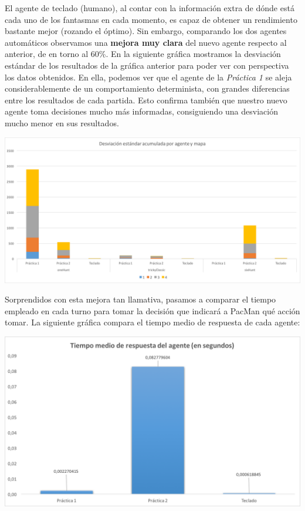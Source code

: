 \documentclass[12pt]{article}
\begin{document}
El agente de teclado (humano), al contar con la información extra de dónde está cada uno de los fantasmas en cada momento, es capaz de obtener un rendimiento bastante mejor (rozando el óptimo). Sin embargo, comparando los dos agentes automáticos observamos una \textbf{mejora muy clara} del nuevo agente respecto al anterior, de en torno al 60\%. En la siguiente gráfica mostramos la desviación estándar de los resultados de la gráfica anterior para poder ver con perspectiva los datos obtenidos. En ella, podemos ver que el agente de la \textit{Práctica 1} se aleja considerablemente de un comportamiento determinista, con grandes diferencias entre los resultados de cada partida. Esto confirma también que nuestro nuevo agente toma decisiones mucho más informadas, consiguiendo una desviación mucho menor en sus resultados.

\begin{center}
    \includegraphics[width=15cm]{stdDev}
\end{center}

Sorprendidos con esta mejora tan llamativa, pasamos a comparar el tiempo empleado en cada turno para tomar la decisión que indicará a PacMan qué acción tomar. La siguiente gráfica compara el tiempo medio de respuesta de cada agente:


\begin{center}
    \includegraphics[width=15cm]{tiempoRespuesta}
\end{center}
\end{document}
